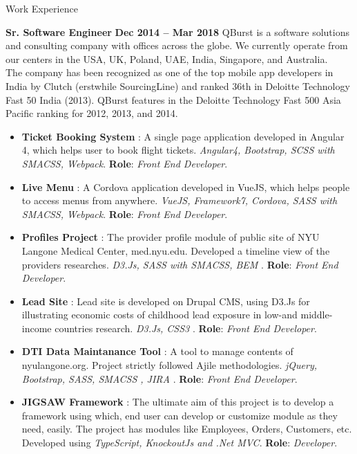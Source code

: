\documentclass{resume}
\begin{document}
\begin{category}{Work Experience}
  
  \citemnobullet \textbf{Sr. Software Engineer} \hfill \textbf{Dec 2014 -- Mar 2018}
  \citemnobullet QBurst is a software solutions and consulting company with offices across the globe.
We currently operate from our centers in the USA, UK, Poland, UAE, India, Singapore, and Australia. \\The company has been recognized as one of the top mobile app developers in India by Clutch (erstwhile SourcingLine) and ranked 36th in Deloitte Technology Fast 50 India (2013). QBurst features in the Deloitte Technology Fast 500 Asia Pacific ranking for 2012, 2013, and 2014.
  \begin{itemize}
  \item \textbf{Ticket Booking System} : A single page application developed in Angular 4, which helps user to book flight tickets. {\em Angular4, Bootstrap, SCSS with SMACSS, Webpack}. \textbf{Role}: {\em Front End Developer}. 
  \item \textbf{Live Menu} : A Cordova application developed in VueJS, which helps people to access menus from anywhere. {\em VueJS, Framework7, Cordova, SASS with SMACSS, Webpack}. \textbf{Role}: {\em Front End Developer}. 
  \item \textbf{Profiles Project} : The provider profile module of public site of NYU Langone Medical Center, med.nyu.edu. Developed a timeline view of the providers researches. {\em D3.Js, SASS with SMACSS, BEM }. \textbf{Role}: {\em Front End Developer}. 
  \item \textbf{Lead Site} : Lead site is developed on Drupal CMS, using D3.Js for illustrating economic costs of childhood lead exposure in low-and middle-income countries research. {\em D3.Js, CSS3 }. \textbf{Role}: {\em Front End Developer}. 
  \item \textbf{DTI Data Maintanance Tool} : A tool to manage contents of nyulangone.org. Project strictly followed Ajile methodologies. {\em jQuery, Bootstrap, SASS, SMACSS , JIRA }. \textbf{Role}: {\em Front End Developer}. 
  \item \textbf{JIGSAW Framework} : The ultimate aim of this project is to develop a framework using which, end user can develop  or customize module as they need, easily. The project has modules like Employees, Orders, Customers, etc. Developed using {\em TypeScript, KnockoutJs and .Net MVC}. \textbf{Role}: {\em Developer}.
  \end{itemize}


\end{category}
\end{document}
